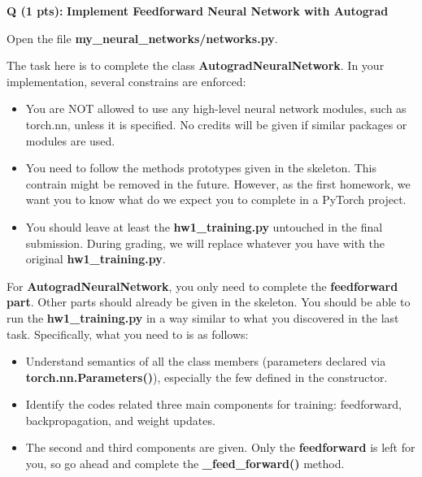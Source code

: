 \documentclass{article}
\newcommand{\homeworknumber}{1}
\newcounter{questionno}
\newcounter{partno}
\newcommand{\question}[1]{
\noindent
\newline
\stepcounter{questionno}
\setcounter{partno}{0}
{\bf Q\arabic{questionno} (#1 pts): }
}
\begin{document}
\question{1}{\bf Implement Feedforward Neural Network with Autograd}

\noindent Open the file \textbf{my\_neural\_networks/networks.py}.

\hfill

\noindent The task here is to complete the class \textbf{AutogradNeuralNetwork}. In your implementation, several constrains are enforced:
\begin{itemize}
  \item You are NOT allowed to use any high-level neural network modules,
    such as torch.nn, unless it is specified. No credits will be given if
    similar packages or modules are used.
  \item You need to follow the methods prototypes given in the skeleton. This
    contrain might be removed in the future. However, as the first homework,
    we want you to know what do we expect you to complete in a PyTorch project.
  \item You should leave at least the \textbf{hw\homeworknumber\_training.py} untouched in the final submission.
  During grading, we will replace whatever you have with the original \textbf{hw\homeworknumber\_training.py}.
\end{itemize}

\noindent For \textbf{AutogradNeuralNetwork}, you only need to complete the \textbf{feedforward part}. Other parts should already be given in the skeleton. You should be able to run the \textbf{hw\homeworknumber\_training.py} in a way similar to what you discovered in the last task. Specifically, what you need to is as follows:

\begin{itemize}
  \item Understand semantics of all the class members (parameters declared via \textbf{torch.nn.Parameters()}), especially the few defined in the constructor.
  \item Identify the codes related three main components for training: feedforward, backpropagation, and weight updates.
  \item The second and third components are given. Only the \textbf{feedforward} is left for you, so go ahead and complete the \textbf{\_feed\_forward()} method.
\end{itemize}

\newpage
\end{document}
